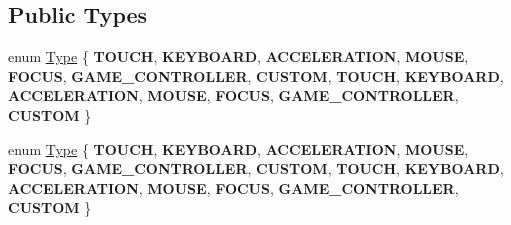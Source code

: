 \subsection*{Public Types}
\begin{DoxyCompactItemize}
\item 
enum \hyperlink{classEvent_a2abf13b5be49315e9e362af02029f058}{Type} \{ \newline
{\bfseries T\+O\+U\+CH}, 
{\bfseries K\+E\+Y\+B\+O\+A\+RD}, 
{\bfseries A\+C\+C\+E\+L\+E\+R\+A\+T\+I\+ON}, 
{\bfseries M\+O\+U\+SE}, 
\newline
{\bfseries F\+O\+C\+US}, 
{\bfseries G\+A\+M\+E\+\_\+\+C\+O\+N\+T\+R\+O\+L\+L\+ER}, 
{\bfseries C\+U\+S\+T\+OM}, 
{\bfseries T\+O\+U\+CH}, 
\newline
{\bfseries K\+E\+Y\+B\+O\+A\+RD}, 
{\bfseries A\+C\+C\+E\+L\+E\+R\+A\+T\+I\+ON}, 
{\bfseries M\+O\+U\+SE}, 
{\bfseries F\+O\+C\+US}, 
\newline
{\bfseries G\+A\+M\+E\+\_\+\+C\+O\+N\+T\+R\+O\+L\+L\+ER}, 
{\bfseries C\+U\+S\+T\+OM}
 \}
\item 
enum \hyperlink{classEvent_a2abf13b5be49315e9e362af02029f058}{Type} \{ \newline
{\bfseries T\+O\+U\+CH}, 
{\bfseries K\+E\+Y\+B\+O\+A\+RD}, 
{\bfseries A\+C\+C\+E\+L\+E\+R\+A\+T\+I\+ON}, 
{\bfseries M\+O\+U\+SE}, 
\newline
{\bfseries F\+O\+C\+US}, 
{\bfseries G\+A\+M\+E\+\_\+\+C\+O\+N\+T\+R\+O\+L\+L\+ER}, 
{\bfseries C\+U\+S\+T\+OM}, 
{\bfseries T\+O\+U\+CH}, 
\newline
{\bfseries K\+E\+Y\+B\+O\+A\+RD}, 
{\bfseries A\+C\+C\+E\+L\+E\+R\+A\+T\+I\+ON}, 
{\bfseries M\+O\+U\+SE}, 
{\bfseries F\+O\+C\+US}, 
\newline
{\bfseries G\+A\+M\+E\+\_\+\+C\+O\+N\+T\+R\+O\+L\+L\+ER}, 
{\bfseries C\+U\+S\+T\+OM}
 \}
\end{DoxyCompactItemize}
